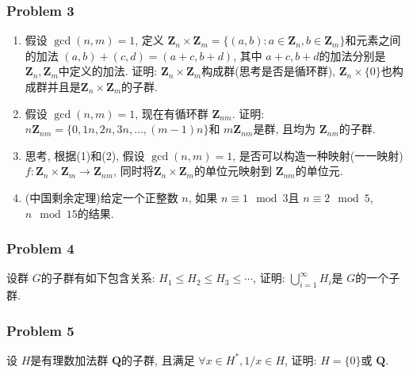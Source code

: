 \documentclass[a4paper,12pt]{ctexart}
\newcommand{\Z}{\mathbf{Z}}
\newcommand{\Q}{\mathbf{Q}}
\newcommand{\R}{\mathbf{R}}
\begin{document}
\subsubsection*{Problem 3} 
    \begin{enumerate}[label=(\arabic*)]
        \item 假设 $ \gcd(n,m)=1 $, 定义 $ \Z_n\times\Z_m=\{(a,b):a\in\Z_n, b\in\Z_m\} $和元素之间的加法 $ (a,b)+(c,d)=(a+c,b+d) $, 其中 $ a+c,b+d $的加法分别是 $ \Z_n,\Z_m $中定义的加法.
        证明: $ \Z_n\times\Z_m $构成群(思考是否是循环群), $ \Z_n\times\{0\} $也构成群并且是$ \Z_n\times\Z_m $的子群. 
        \item 假设 $ \gcd(n,m)=1 $, 现在有循环群 $ \Z_{nm} $. 证明: $ n\Z_{nm}=\{0,1n,2n,3n,\dots,(m-1)n\} $和 $ m\Z_{nm} $是群, 且均为 $ \Z_{nm} $的子群.
        \item 思考, 根据(1)和(2), 假设 $ \gcd(n,m)=1 $, 是否可以构造一种映射(一一映射) $ f:\Z_n\times\Z_m\rightarrow\Z_{nm} $, 同时将$ \Z_n\times\Z_m $的单位元映射到 $ \Z_{nm} $的单位元. 
        \item (中国剩余定理)给定一个正整数 $ n $, 如果 $ n\equiv 1\mod{3} $且 $ n\equiv 2\mod{5} $,  ~$ n\mod{15} $的结果.
    \end{enumerate} 
\subsubsection*{Problem 4}
    设群 $ G $的子群有如下包含关系: $ H_1\leq H_2\leq H_3\leq\cdots $, 证明: $ \bigcup_{i=1}^{\infty}H_i $是 $ G $的一个子群.
\subsubsection*{Problem 5}
    设 $ H $是有理数加法群 $ \Q $的子群, 且满足 $\forall x\in H^*, 1/x\in H $, 证明: $ H=\{0\} $或 $ \Q $.
\end{document}
